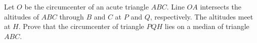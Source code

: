 Let 
$O$
be the circumcenter of an acute triangle
$ABC$.
 Line 
$OA$
 intersects the altitudes of 
$ABC$
 through 
$B$
 and 
$C$
 at 
$P$
 and 
$Q$,
 respectively. The altitudes meet at 
$H$.
 Prove that the circumcenter of triangle 
$PQH$
 lies on a median of triangle 
$ABC$.
